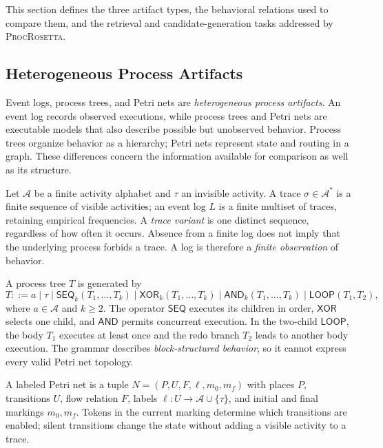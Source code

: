 \documentclass[mathematics,article,submit,moreauthors]{Definitions/mdpi}
\newcommand{\model}{\textsc{ProcRosetta}\xspace}
\newcommand{\tauact}{\ensuremath{\tau}}
\begin{document}
This section defines the three artifact types, the behavioral relations used to compare them, and the retrieval and candidate-generation tasks addressed by \model.

\subsection{Heterogeneous Process Artifacts}

Event logs, process trees, and Petri nets are \emph{heterogeneous process artifacts}. An event log records observed executions, while process trees and Petri nets are executable models that also describe possible but unobserved behavior. Process trees organize behavior as a hierarchy; Petri nets represent state and routing in a graph. These differences concern the information available for comparison as well as its structure.

Let $\mathcal{A}$ be a finite activity alphabet and $\tauact$ an invisible activity. A trace $\sigma\in\mathcal{A}^{*}$ is a finite sequence of visible activities; an event log $L$ is a finite multiset of traces, retaining empirical frequencies. A \emph{trace variant} is one distinct sequence, regardless of how often it occurs. Absence from a finite log does not imply that the underlying process forbids a trace. A log is therefore a \emph{finite observation} of behavior.

A process tree $T$ is generated by
\begin{equation}
T ::= a \mid \tauact \mid \mathsf{SEQ}_{k}(T_1,\ldots,T_k)
 \mid \mathsf{XOR}_{k}(T_1,\ldots,T_k)
 \mid \mathsf{AND}_{k}(T_1,\ldots,T_k)
 \mid \mathsf{LOOP}(T_1,T_2),
\label{eq:grammar}
\end{equation}
where $a\in\mathcal{A}$ and $k\geq2$. The operator $\mathsf{SEQ}$ executes its children in order, $\mathsf{XOR}$ selects one child, and $\mathsf{AND}$ permits concurrent execution. In the two-child $\mathsf{LOOP}$, the body $T_1$ executes at least once and the redo branch $T_2$ leads to another body execution. The grammar describes \emph{block-structured behavior}, so it cannot express every valid Petri net topology.

A labeled Petri net is a tuple $N=(P,U,F,\ell,m_0,m_f)$ with places $P$, transitions $U$, flow relation $F$, labels $\ell:U\rightarrow\mathcal{A}\cup\{\tauact\}$, and initial and final markings $m_0,m_f$. Tokens in the current marking determine which transitions are enabled; silent transitions change the state without adding a visible activity to a trace.
\end{document}
